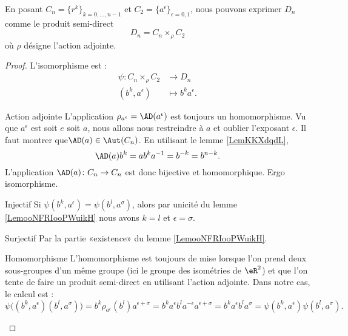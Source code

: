\begin{proposition}
    En posant \( C_n=\{ r^k \}_{k=0,\ldots, n-1}\) et \( C_2=\{ a^{\epsilon} \}_{\epsilon=0,1}\), nous pouvons exprimer \( D_n\) comme le produit semi-direct
    \begin{equation}
        D_n=C_n\times_{\rho}C_2
    \end{equation}
    où \( \rho\) désigne l'action adjointe.
\end{proposition}

\begin{proof}
    L'isomorphisme est :
    \begin{equation}
        \begin{aligned}
            \psi\colon C_n\times_{\rho}C_2&\to D_n \\
            (b^k,a^{\epsilon})&\mapsto b^ka^{\epsilon}.
        \end{aligned}
    \end{equation}
    \begin{subproof}
        \item[Action adjointe]
            L'application \( \rho_{a^{\epsilon}}=\AD(a^{\epsilon})\) est toujours un homomorphisme. Vu que \( a^{\epsilon}\) est soit \( e\) soit \( a\), nous allons nous restreindre à \( a\) et oublier l'exposant \( \epsilon\). Il faut montrer que\( \AD(a)\in\Aut(C_n)\). En utilisant le lemme \ref{LemKKXdqdL},
            \begin{equation}
                \AD(a)b^k=ab^ka^{-1}=b^{-k}=b^{n-k}.
            \end{equation}
            L'application \( \AD(a)\colon C_n\to C_n\) est donc bijective et homomorphique. Ergo isomorphisme.
        \item[Injectif]
            Si \( \psi(b^k,a^{\epsilon})=\psi(b^l,a^{\sigma})\), alors par unicité du lemme \ref{LemooNFRIooPWuikH} nous avons \( k=l\) et \( \epsilon=\sigma\).
        \item[Surjectif]
            Par la partie «existence»  du lemme \ref{LemooNFRIooPWuikH}.
        \item[Homomorphisme]
            L'homomorphisme est toujours de mise lorsque l'on prend deux sous-groupes d'un même groupe (ici le groupe des isométries de \( \eR^2\)) et que l'on tente de faire un produit semi-direct en utilisant l'action adjointe. Dans notre cas, le calcul est : 
            \begin{equation}
                \psi\big( (b^k,a^{\epsilon})(b^l,a^{\sigma}) \big)=b^k\rho_{a^{\epsilon}}(b^l)a^{\epsilon+\sigma}=b^ka^{\epsilon}b^la^{-\epsilon}a^{\epsilon+\sigma}=b^ka^{\epsilon}b^la^{\sigma}=\psi(b^k,a^{\epsilon})\psi(b^l,a^{\sigma}).
            \end{equation}
    \end{subproof}
\end{proof}

